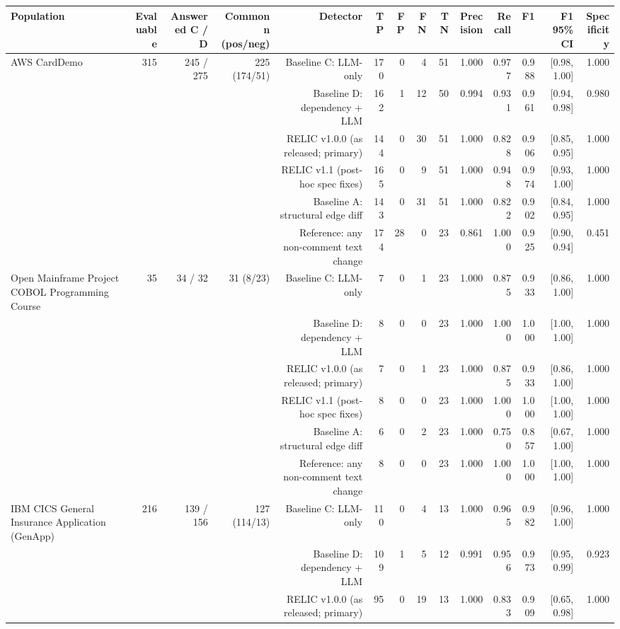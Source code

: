 \begin{tabular}{lrrrrrrrrrrrrr}
\toprule
Population & Evaluable & Answered C / D & Common n (pos/neg) & Detector & TP & FP & FN & TN & Precision & Recall & F1 & F1 95\% CI & Specificity \\
\midrule
AWS CardDemo & 315 & 245 / 275 & 225 (174/51) & Baseline C: LLM-only & 170 & 0 & 4 & 51 & 1.000 & 0.977 & 0.988 & [0.98, 1.00] & 1.000 \\
 &  &  &  & Baseline D: dependency + LLM & 162 & 1 & 12 & 50 & 0.994 & 0.931 & 0.961 & [0.94, 0.98] & 0.980 \\
 &  &  &  & RELIC v1.0.0 (as released; primary) & 144 & 0 & 30 & 51 & 1.000 & 0.828 & 0.906 & [0.85, 0.95] & 1.000 \\
 &  &  &  & RELIC v1.1 (post-hoc spec fixes) & 165 & 0 & 9 & 51 & 1.000 & 0.948 & 0.974 & [0.93, 1.00] & 1.000 \\
 &  &  &  & Baseline A: structural edge diff & 143 & 0 & 31 & 51 & 1.000 & 0.822 & 0.902 & [0.84, 0.95] & 1.000 \\
 &  &  &  & Reference: any non-comment text change & 174 & 28 & 0 & 23 & 0.861 & 1.000 & 0.925 & [0.90, 0.94] & 0.451 \\
Open Mainframe Project COBOL Programming Course & 35 & 34 / 32 & 31 (8/23) & Baseline C: LLM-only & 7 & 0 & 1 & 23 & 1.000 & 0.875 & 0.933 & [0.86, 1.00] & 1.000 \\
 &  &  &  & Baseline D: dependency + LLM & 8 & 0 & 0 & 23 & 1.000 & 1.000 & 1.000 & [1.00, 1.00] & 1.000 \\
 &  &  &  & RELIC v1.0.0 (as released; primary) & 7 & 0 & 1 & 23 & 1.000 & 0.875 & 0.933 & [0.86, 1.00] & 1.000 \\
 &  &  &  & RELIC v1.1 (post-hoc spec fixes) & 8 & 0 & 0 & 23 & 1.000 & 1.000 & 1.000 & [1.00, 1.00] & 1.000 \\
 &  &  &  & Baseline A: structural edge diff & 6 & 0 & 2 & 23 & 1.000 & 0.750 & 0.857 & [0.67, 1.00] & 1.000 \\
 &  &  &  & Reference: any non-comment text change & 8 & 0 & 0 & 23 & 1.000 & 1.000 & 1.000 & [1.00, 1.00] & 1.000 \\
IBM CICS General Insurance Application (GenApp) & 216 & 139 / 156 & 127 (114/13) & Baseline C: LLM-only & 110 & 0 & 4 & 13 & 1.000 & 0.965 & 0.982 & [0.96, 1.00] & 1.000 \\
 &  &  &  & Baseline D: dependency + LLM & 109 & 1 & 5 & 12 & 0.991 & 0.956 & 0.973 & [0.95, 0.99] & 0.923 \\
 &  &  &  & RELIC v1.0.0 (as released; primary) & 95 & 0 & 19 & 13 & 1.000 & 0.833 & 0.909 & [0.65, 0.98] & 1.000 \\

\end{tabular}
